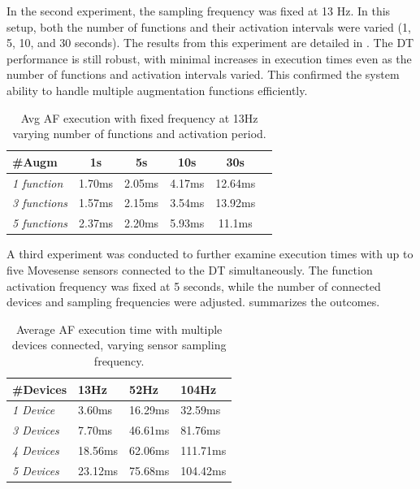In the second experiment, the sampling frequency was fixed at 13 Hz.
%
In this setup, both the number of functions and their activation intervals were varied (1, 5, 10, and 30 seconds). The results from this experiment are detailed in .
The \ac{DT} performance is still robust, with minimal increases in execution times even as the number of functions and activation intervals varied. This confirmed the system ability to handle multiple augmentation functions efficiently.
%
\begin{table}
    \centering
    \begin{tabular}{p{4cm} p{0.4cm} p{2cm} p{2cm} p{2cm} p{2cm}}
    \hline
    \textbf{\#Augm} & \multicolumn{1}{c}{\textbf{1s}} & \multicolumn{1}{c}{\textbf{5s}} & \multicolumn{1}{c}{\textbf{10s}} & \multicolumn{1}{c}{\textbf{30s}}\\ \hline
    \textit{1 function} & \multicolumn{1}{c}{1.70ms} & \multicolumn{1}{c}{2.05ms} & \multicolumn{1}{c}{4.17ms} & \multicolumn{1}{c}{12.64ms}\\ \hline
    \textit{3 functions} & \multicolumn{1}{c}{1.57ms} & \multicolumn{1}{c}{2.15ms} & \multicolumn{1}{c}{3.54ms} & \multicolumn{1}{c}{13.92ms}\\ \hline
    \textit{5 functions} & \multicolumn{1}{c}{2.37ms} & \multicolumn{1}{c}{2.20ms} & \multicolumn{1}{c}{5.93ms} & \multicolumn{1}{c}{11.1ms}\\ \hline\hline
    \end{tabular}
     \caption{Avg AF execution with fixed frequency at 13Hz varying number of functions and activation period.}
    \label{tab:AF_exec_time_fixed_sens_frequency}
\end{table}

A third experiment was conducted to further examine execution times with up to five Movesense sensors connected to the DT simultaneously. The function activation frequency was fixed at 5 seconds, while the number of connected devices and sampling frequencies were adjusted.  summarizes the outcomes. 

\begin{table}
    \centering
    \begin{tabular}{p{4cm} p{2cm} p{2cm} p{2cm}}
    \hline
    \textbf{\#Devices} & \textbf{13Hz} & \textbf{52Hz} & \textbf{104Hz} \\ \hline
    \textit{1 Device} & 3.60ms & 16.29ms & 32.59ms \\ \hline
    \textit{3 Devices} & 7.70ms & 46.61ms & 81.76ms \\ \hline
    \textit{4 Devices} & 18.56ms & 62.06ms & 111.71ms \\ \hline
    \textit{5 Devices} & 23.12ms & 75.68ms & 104.42ms \\ \hline\hline
    \end{tabular}
    \caption{Average AF execution time with multiple devices connected, varying sensor sampling frequency.}
    \label{tab:AF_exec_time_multiple_devices}
\end{table}

